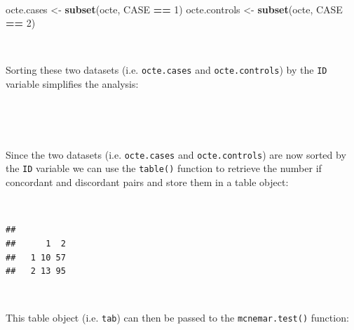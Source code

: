 \documentclass[12pt,a4paper]{book}
\newenvironment{Shaded}{\begin{snugshade}}{\end{snugshade}}
\newcommand{\DecValTok}[1]{\textcolor[rgb]{0.00,0.00,0.81}{#1}}
\newcommand{\KeywordTok}[1]{\textcolor[rgb]{0.13,0.29,0.53}{\textbf{#1}}}
\newcommand{\NormalTok}[1]{#1}
\newcommand{\OperatorTok}[1]{\textcolor[rgb]{0.81,0.36,0.00}{\textbf{#1}}}
\newcommand{\StringTok}[1]{\textcolor[rgb]{0.31,0.60,0.02}{#1}}
\theoremstyle{definition}
\theoremstyle{definition}
\theoremstyle{definition}
\theoremstyle{remark}
\begin{document}
~

\begin{Shaded}
\begin{Highlighting}[]
\NormalTok{octe.cases <-}\StringTok{ }\KeywordTok{subset}\NormalTok{(octe, CASE }\OperatorTok{==}\StringTok{ }\DecValTok{1}\NormalTok{)}
\NormalTok{octe.controls <-}\StringTok{ }\KeywordTok{subset}\NormalTok{(octe, CASE }\OperatorTok{==}\StringTok{ }\DecValTok{2}\NormalTok{)}
\end{Highlighting}
\end{Shaded}

~

Sorting these two datasets (i.e. \texttt{octe.cases} and
\texttt{octe.controls}) by the \texttt{ID} variable simplifies the
analysis:

~

\begin{Shaded}
\end{Shaded}

~

Since the two datasets (i.e. \texttt{octe.cases} and
\texttt{octe.controls}) are now sorted by the \texttt{ID} variable we
can use the \texttt{table()} function to retrieve the number if
concordant and discordant pairs and store them in a table object:

~

\begin{Shaded}
\end{Shaded}

\begin{verbatim}
##    
##      1  2
##   1 10 57
##   2 13 95
\end{verbatim}

~

This table object (i.e. \texttt{tab}) can then be passed to the
\texttt{mcnemar.test()} function:

~
\end{document}

